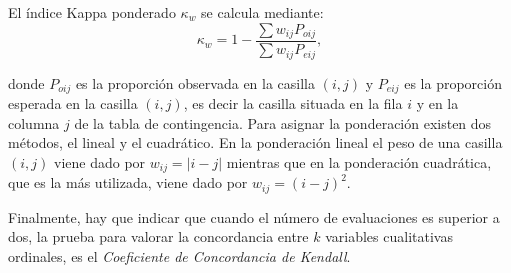 El índice Kappa ponderado $\kappa_{w}$ se calcula mediante:
\[
\kappa_w= 1-\frac{\sum w_{ij}P_{oij}}{\sum w_{ij}P_{eij}},
\]

donde $P_{oij}$ es la proporción observada en la casilla $(i,j)$ y $P_{eij}$ es la proporción esperada en la casilla $(i,j)$, es decir la
 casilla situada en la fila $i$ y en la columna $j$ de la tabla de contingencia. Para asignar la ponderación existen dos métodos, el lineal y el cuadrático. En la
 ponderación lineal el peso de una casilla $(i,j)$ viene dado por $w_{ij} = |i-j|$ mientras que en la ponderación cuadrática, que es la más
 utilizada, viene dado por $w_{ij} = (i-j)^{2}$.

Finalmente, hay que indicar que cuando el número de evaluaciones es superior a dos, la prueba para valorar la concordancia entre $k$ variables cualitativas ordinales, es el
 \emph{Coeficiente de Concordancia de Kendall}.


\clearpage
\newpage

